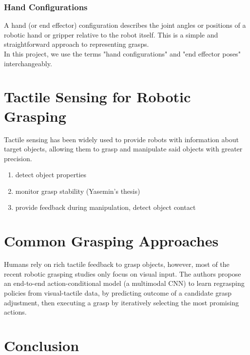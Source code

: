 \documentclass[11pt, a4paper]{report}
\theoremstyle{definition}
\begin{document}
\subsubsection{Hand Configurations}
\label{sec:2.1.1.3}
A hand (or end effector) configuration describes the joint angles or positions of a robotic hand or gripper relative to the robot itself. This is a simple and straightforward approach to representing grasps.\\

In this project, we use the terms "hand configurations" and "end effector poses" interchangeably.


\section{Tactile Sensing for Robotic Grasping}
\label{sec:2.2}
Tactile sensing has been widely used to provide robots with information about target objects, allowing them to grasp and manipulate said objects with greater precision.

\begin{enumerate}
    \item detect object properties
    \item monitor grasp stability (Yasemin's thesis)
    \item provide feedback during manipulation, detect object contact
\end{enumerate}


\section{Common Grasping Approaches}
\label{sec:2.3}
Humans rely on rich tactile feedback to grasp objects, however, most of the recent robotic grasping studies only focus on visual input. The authors propose an end-to-end action-conditional model (a multimodal CNN) to learn regrasping policies from visual-tactile data, by predicting outcome of a candidate grasp adjustment, then executing a grasp by iteratively selecting the most promising actions\cite{Calandra_2018}.


\section{Conclusion}
\label{sec:2.4}


\end{document}
